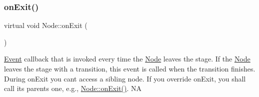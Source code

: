 \mbox{\label{classNode_ae97adc8e1de122017736546f33b01455}} 
\subsubsection{\texorpdfstring{on\+Exit()}{onExit()}\hspace{0.1cm}{\footnotesize\ttfamily [2/2]}}
{\footnotesize\ttfamily virtual void Node\+::on\+Exit (\begin{DoxyParamCaption}{ }\end{DoxyParamCaption})\hspace{0.3cm}{\ttfamily [virtual]}}

\hyperlink{classEvent}{Event} callback that is invoked every time the \hyperlink{classNode}{Node} leaves the \textquotesingle{}stage\textquotesingle{}. If the \hyperlink{classNode}{Node} leaves the \textquotesingle{}stage\textquotesingle{} with a transition, this event is called when the transition finishes. During on\+Exit you can\textquotesingle{}t access a sibling node. If you override on\+Exit, you shall call its parent\textquotesingle{}s one, e.\+g., \hyperlink{classNode_ac83de835ea315e3179d4293acd8903ac}{Node\+::on\+Exit()}.  NA 

